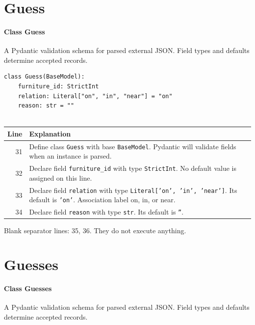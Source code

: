 \documentclass[11pt,a4paper]{book}
\begin{document}
\section{Guess}

\paragraph{Class Guess}
A Pydantic validation schema for parsed external JSON. Field types and defaults determine accepted records.


\begin{lstlisting}[firstnumber=31]
class Guess(BaseModel):
    furniture_id: StrictInt
    relation: Literal["on", "in", "near"] = "on"
    reason: str = ""


\end{lstlisting}

\begin{longtable}{r p{}}

\textbf{Line} & \textbf{Explanation} \\ \hline \endhead

31 & Define class \texttt{Guess} with base \texttt{BaseModel}. Pydantic will validate fields when an instance is parsed. \\

32 & Declare field \texttt{furniture\_id} with type \texttt{StrictInt}. No default value is assigned on this line. \\

33 & Declare field \texttt{relation} with type \texttt{Literal['on', 'in', 'near']}. Its default is \texttt{'on'}. Association label on, in, or near. \\

34 & Declare field \texttt{reason} with type \texttt{str}. Its default is \texttt{''}.  \\

\end{longtable}

Blank separator lines: 35, 36. They do not execute anything.

\section{Guesses}

\paragraph{Class Guesses}
A Pydantic validation schema for parsed external JSON. Field types and defaults determine accepted records.
\end{document}
